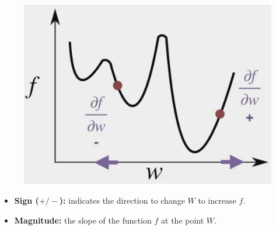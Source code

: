 \documentclass[12pt, a4paper]{article}
\begin{document}
\begin{figure}[H]
  \centering
    \includegraphics[width=0.8\columnwidth]{images/derivatives.png}
    \label{fig:derivatives}
\end{figure}

\begin{itemize}
  \item \textbf{Sign ($+ / -$):} indicates the direction to change $W$ to increase $f$.
  \item \textbf{Magnitude:} the slope of the function $f$ at the point $W$.
\end{itemize}
\end{document}
